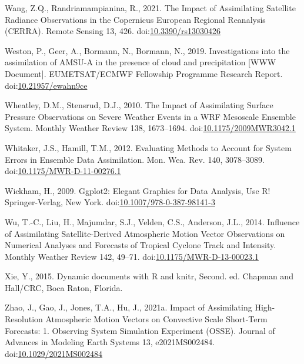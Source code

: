 \documentclass[authoryear,preprint,review,12pt]{elsarticle} %
\begin{document}
\leavevmode\hypertarget{ref-wang2021}{}%
Wang, Z.Q., Randriamampianina, R., 2021. The Impact of Assimilating Satellite Radiance Observations in the Copernicus European Regional Reanalysis (CERRA). Remote Sensing 13, 426. doi:\href{https://doi.org/10.3390/rs13030426}{10.3390/rs13030426}

\leavevmode\hypertarget{ref-weston2019}{}%
Weston, P., Geer, A., Bormann, N., Bormann, N., 2019. Investigations into the assimilation of AMSU-A in the presence of cloud and precipitation {[}WWW Document{]}. EUMETSAT/ECMWF Fellowship Programme Research Report. doi:\href{https://doi.org/10.21957/ewahn9ce}{10.21957/ewahn9ce}

\leavevmode\hypertarget{ref-wheatley2010}{}%
Wheatley, D.M., Stensrud, D.J., 2010. The Impact of Assimilating Surface Pressure Observations on Severe Weather Events in a WRF Mesoscale Ensemble System. Monthly Weather Review 138, 1673--1694. doi:\href{https://doi.org/10.1175/2009MWR3042.1}{10.1175/2009MWR3042.1}

\leavevmode\hypertarget{ref-whitaker2012}{}%
Whitaker, J.S., Hamill, T.M., 2012. Evaluating Methods to Account for System Errors in Ensemble Data Assimilation. Mon. Wea. Rev. 140, 3078--3089. doi:\href{https://doi.org/10.1175/MWR-D-11-00276.1}{10.1175/MWR-D-11-00276.1}

\leavevmode\hypertarget{ref-wickham2009}{}%
Wickham, H., 2009. Ggplot2: Elegant Graphics for Data Analysis, Use R! Springer-Verlag, New York. doi:\href{https://doi.org/10.1007/978-0-387-98141-3}{10.1007/978-0-387-98141-3}

\leavevmode\hypertarget{ref-wu2014}{}%
Wu, T.-C., Liu, H., Majumdar, S.J., Velden, C.S., Anderson, J.L., 2014. Influence of Assimilating Satellite-Derived Atmospheric Motion Vector Observations on Numerical Analyses and Forecasts of Tropical Cyclone Track and Intensity. Monthly Weather Review 142, 49--71. doi:\href{https://doi.org/10.1175/MWR-D-13-00023.1}{10.1175/MWR-D-13-00023.1}

\leavevmode\hypertarget{ref-xie2015}{}%
Xie, Y., 2015. Dynamic documents with R and knitr, Second. ed. Chapman and Hall/CRC, Boca Raton, Florida.

\leavevmode\hypertarget{ref-zhao2021}{}%
Zhao, J., Gao, J., Jones, T.A., Hu, J., 2021a. Impact of Assimilating High-Resolution Atmospheric Motion Vectors on Convective Scale Short-Term Forecasts: 1. Observing System Simulation Experiment (OSSE). Journal of Advances in Modeling Earth Systems 13, e2021MS002484. doi:\href{https://doi.org/10.1029/2021MS002484}{10.1029/2021MS002484}
\end{document}
